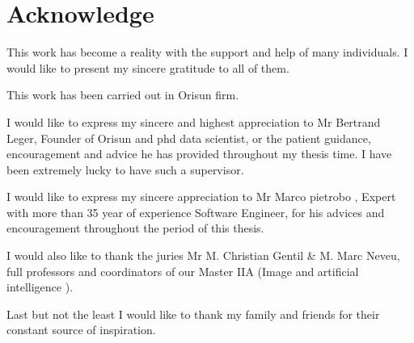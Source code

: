 \chapter*{Acknowledge}

\begin{center}
\Large{ \bf{ \it
{\selectfont

This work has become a reality with the support and  help of many individuals. I would like to present my sincere gratitude to all of them.

This work has been carried out in  Orisun firm.

I would like to express my sincere and highest appreciation to Mr Bertrand Leger, Founder  of Orisun  and phd data scientist, or the patient guidance, encouragement and advice he has provided throughout my thesis time. I have been extremely lucky to have such a supervisor.

I would like to express my sincere appreciation to Mr Marco pietrobo , Expert  with more than 35 year of experience  Software Engineer, for his advices and encouragement throughout the period of this thesis. 


I would also like to thank the juries  Mr M. Christian Gentil \& M. Marc Neveu, full professors and coordinators of our Master IIA (Image and artificial intelligence ).

Last but not the least I would like to thank my family and friends for their constant source of inspiration.

}
}
}
\end{center}